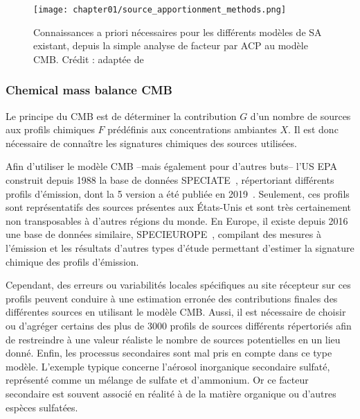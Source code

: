\begin{figure}[ht]
    \centering
    \texttt{[image: chapter01/source\_apportionment\_methods.png]}
    \caption{
        Connaissances a priori nécessaires pour les différents modèles de SA existant,
        depuis la simple analyse de facteur par ACP au modèle CMB. Crédit :
        \cite{vianaSource2008} adaptée de \cite{schauerCharacterization2006}
    }%
    \label{fig:chapter01/source_apportionment_methods}
\end{figure}

\subsubsection{Chemical mass balance CMB}%
\label{ssub:chemical_mass_balance_cmb}

Le principe du CMB est de déterminer la contribution $G$ d'un nombre de sources
aux profils chimiques $F$ prédéfinis aux concentrations ambiantes $X$. Il est donc
nécessaire de connaître les signatures chimiques des sources utilisées.

Afin d'utiliser le modèle CMB --mais également pour d'autres buts-- l'US EPA construit
depuis 1988 la base de données SPECIATE~\autocite{simonDevelopment2010}, répertoriant
différents profils d'émission, dont la 5\ieme{}
version a été publiée en 2019~\autocite{u.s.environmentalprotectionagencySPECIATE2019}.
Seulement, ces profils sont représentatifs des sources présentes aux États-Unis et sont
très certainement non transposables à d'autres régions du monde.
En Europe, il existe depuis 2016 une base de données similaire,
SPECIEUROPE~\autocite{pernigottiSPECIEUROPE2016}, compilant des mesures à l'émission et
les résultats d'autres types d'étude permettant d'estimer la signature chimique des
profils d'émission.

Cependant, des erreurs ou variabilités locales spécifiques au site récepteur sur ces
profils peuvent conduire à une estimation erronée des contributions finales des
différentes sources en utilisant le modèle CMB.
Aussi, il est nécessaire de choisir ou d'agréger certains des plus de 3000 profils de sources
différents répertoriés afin de restreindre à une valeur réaliste le nombre de sources
potentielles en un lieu donné.
Enfin, les processus secondaires sont mal pris en compte dans ce type modèle. L'exemple typique
concerne l'aérosol inorganique secondaire sulfaté, représenté comme un mélange de sulfate
et d'ammonium. Or ce facteur secondaire est souvent associé en réalité à de la matière
organique ou d'autres espèces sulfatées.

